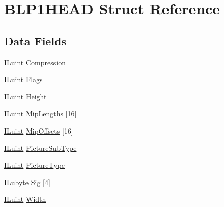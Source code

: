 \hypertarget{struct_b_l_p1_h_e_a_d}{\section{B\-L\-P1\-H\-E\-A\-D Struct Reference}
\label{struct_b_l_p1_h_e_a_d}
}
\subsection*{Data Fields}
\begin{DoxyCompactItemize}
\item 
\hyperlink{il_8h_ac6508d0e9c19e32f32e00d54b5b8cf30}{I\-Luint} \hyperlink{struct_b_l_p1_h_e_a_d_aeee1c59752b91663ab7d48e1ee5db380}{Compression}
\item 
\hyperlink{il_8h_ac6508d0e9c19e32f32e00d54b5b8cf30}{I\-Luint} \hyperlink{struct_b_l_p1_h_e_a_d_ad5c4db01d6ffdff05862b7052afa79fc}{Flags}
\item 
\hyperlink{il_8h_ac6508d0e9c19e32f32e00d54b5b8cf30}{I\-Luint} \hyperlink{struct_b_l_p1_h_e_a_d_a8a8093d76b61a95fc96df24af29b107a}{Height}
\item 
\hyperlink{il_8h_ac6508d0e9c19e32f32e00d54b5b8cf30}{I\-Luint} \hyperlink{struct_b_l_p1_h_e_a_d_ab471413d9fd3a00d58f6e262e5672aea}{Mip\-Lengths} \mbox{[}16\mbox{]}
\item 
\hyperlink{il_8h_ac6508d0e9c19e32f32e00d54b5b8cf30}{I\-Luint} \hyperlink{struct_b_l_p1_h_e_a_d_ae1442afe5a13d54073c68f22baca4fb3}{Mip\-Offsets} \mbox{[}16\mbox{]}
\item 
\hyperlink{il_8h_ac6508d0e9c19e32f32e00d54b5b8cf30}{I\-Luint} \hyperlink{struct_b_l_p1_h_e_a_d_aaf9e7209b2ac1b7a95e99dcbb0cc7292}{Picture\-Sub\-Type}
\item 
\hyperlink{il_8h_ac6508d0e9c19e32f32e00d54b5b8cf30}{I\-Luint} \hyperlink{struct_b_l_p1_h_e_a_d_a8120371caf872d5b05cc54a515fd21a1}{Picture\-Type}
\item 
\hyperlink{il_8h_a8d2f04500100a86d1b00e98ab1b15a33}{I\-Lubyte} \hyperlink{struct_b_l_p1_h_e_a_d_a44e23e3cb794abbb3bf035a7c72e0a14}{Sig} \mbox{[}4\mbox{]}
\item 
\hyperlink{il_8h_ac6508d0e9c19e32f32e00d54b5b8cf30}{I\-Luint} \hyperlink{struct_b_l_p1_h_e_a_d_a4146e7b2b0b4097e0e335f9b348392bf}{Width}
\end{DoxyCompactItemize}


